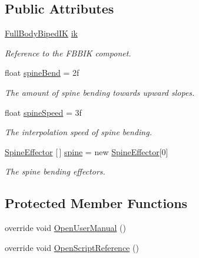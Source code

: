 \subsection*{Public Attributes}
\begin{DoxyCompactItemize}
\item 
\mbox{\hyperlink{class_root_motion_1_1_final_i_k_1_1_full_body_biped_i_k}{Full\+Body\+Biped\+IK}} \mbox{\hyperlink{class_root_motion_1_1_final_i_k_1_1_grounder_f_b_b_i_k_ab9415f36a52d8c0fc07c159e29b51a5b}{ik}}
\begin{DoxyCompactList}\small\item\em Reference to the F\+B\+B\+IK componet. \end{DoxyCompactList}\item 
float \mbox{\hyperlink{class_root_motion_1_1_final_i_k_1_1_grounder_f_b_b_i_k_a3da51554df978914f32d996ee255ccaf}{spine\+Bend}} = 2f
\begin{DoxyCompactList}\small\item\em The amount of spine bending towards upward slopes. \end{DoxyCompactList}\item 
float \mbox{\hyperlink{class_root_motion_1_1_final_i_k_1_1_grounder_f_b_b_i_k_ac3f5bdf163209e90da7f12ed78f01e13}{spine\+Speed}} = 3f
\begin{DoxyCompactList}\small\item\em The interpolation speed of spine bending. \end{DoxyCompactList}\item 
\mbox{\hyperlink{class_root_motion_1_1_final_i_k_1_1_grounder_f_b_b_i_k_1_1_spine_effector}{Spine\+Effector}} \mbox{[}$\,$\mbox{]} \mbox{\hyperlink{class_root_motion_1_1_final_i_k_1_1_grounder_f_b_b_i_k_a3aa444fddf7a1a86810203fbca06121f}{spine}} = new \mbox{\hyperlink{class_root_motion_1_1_final_i_k_1_1_grounder_f_b_b_i_k_1_1_spine_effector}{Spine\+Effector}}\mbox{[}0\mbox{]}
\begin{DoxyCompactList}\small\item\em The spine bending effectors. \end{DoxyCompactList}\end{DoxyCompactItemize}
\subsection*{Protected Member Functions}
\begin{DoxyCompactItemize}
\item 
override void \mbox{\hyperlink{class_root_motion_1_1_final_i_k_1_1_grounder_f_b_b_i_k_a8b63ac0162b00759c2fd31089f30e71b}{Open\+User\+Manual}} ()
\item 
override void \mbox{\hyperlink{class_root_motion_1_1_final_i_k_1_1_grounder_f_b_b_i_k_a9440c51c4b8468067f83b465b005f0d8}{Open\+Script\+Reference}} ()
\end{DoxyCompactItemize}
